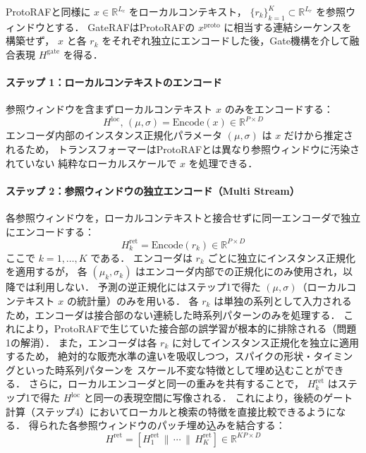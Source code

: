 \documentclass[twocolumn, lastpage]{jarticle}
\begin{document}
ProtoRAFと同様に $x \in \mathbb{R}^{L_c}$ をローカルコンテキスト，
$\{r_k\}_{k=1}^{K} \subset \mathbb{R}^{L_r}$ を参照ウィンドウとする．
GateRAFはProtoRAFの $x^{\mathrm{proto}}$ に相当する連結シーケンスを構築せず，
$x$ と各 $r_k$ をそれぞれ独立にエンコードした後，Gate機構を介して融合表現 $H^{\mathrm{gate}}$ を得る．

    \paragraph{ステップ 1：ローカルコンテキストのエンコード}
    参照ウィンドウを含まずローカルコンテキスト $x$ のみをエンコードする：
        \begin{equation}
            H^{\mathrm{loc}},\, (\mu, \sigma) = \mathrm{Encode}(x) \in \mathbb{R}^{P \times D}
        \end{equation}
    エンコーダ内部のインスタンス正規化パラメータ $(\mu, \sigma)$ は $x$ だけから推定されるため，
    トランスフォーマーはProtoRAFとは異なり参照ウィンドウに汚染されていない
    純粋なローカルスケールで $x$ を処理できる．

    \paragraph{ステップ 2：参照ウィンドウの独立エンコード（Multi Stream）}
    各参照ウィンドウを，ローカルコンテキストと接合せずに同一エンコーダで独立にエンコードする：
        \begin{equation}
            H^{\mathrm{ret}}_k = \mathrm{Encode}(r_k) \in \mathbb{R}^{P \times D}
        \end{equation}
    ここで $k = 1, \ldots, K$ である．
    エンコーダは $r_k$ ごとに独立にインスタンス正規化を適用するが，
    各 $(\mu_k, \sigma_k)$ はエンコーダ内部での正規化にのみ使用され，以降では利用しない．
    予測の逆正規化にはステップ1で得た $(\mu, \sigma)$（ローカルコンテキスト $x$ の統計量）のみを用いる．
    各 $r_k$ は単独の系列として入力されるため，エンコーダは接合部のない連続した時系列パターンのみを処理する．
    これにより，ProtoRAFで生じていた接合部の誤学習が根本的に排除される（問題1の解消）．
    また，エンコーダは各 $r_k$ に対してインスタンス正規化を独立に適用するため，
    絶対的な販売水準の違いを吸収しつつ，スパイクの形状・タイミングといった時系列パターンを
    スケール不変な特徴として埋め込むことができる．
    さらに，ローカルエンコーダと同一の重みを共有することで，
    $H^{\mathrm{ret}}_k$ はステップ1で得た $H^{\mathrm{loc}}$ と同一の表現空間に写像される．
    これにより，後続のゲート計算（ステップ4）においてローカルと検索の特徴を直接比較できるようになる．
    得られた各参照ウィンドウのパッチ埋め込みを結合する：
        \begin{equation}
            H^{\mathrm{ret}} = [H^{\mathrm{ret}}_1 \,\|\, \cdots \,\|\, H^{\mathrm{ret}}_K]
            \in \mathbb{R}^{KP \times D}
        \end{equation}
\end{document}
